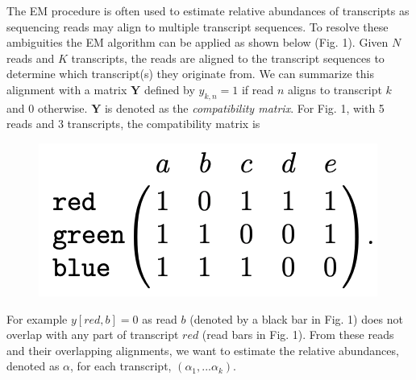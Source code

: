 \documentclass[11pt]{exam}
\begin{document}
\begin{questions}
\begin{parts}
\end{parts}
\newpage

\question[30] The EM procedure is often used to estimate relative abundances of transcripts as sequencing reads may align to multiple transcript sequences. To resolve these ambiguities the EM algorithm can be applied as shown below (Fig. 1). Given $N$ reads and $K$ transcripts, the reads are aligned to the transcript sequences to determine which transcript(s) they originate from. We can summarize this alignment with a matrix $\mathbf{Y}$ defined by $y_{k,n} = 1$ if read $n$ aligns to transcript $k$ and 0 otherwise. $\mathbf{Y}$ is denoted as the \textit{compatibility matrix}. For Fig. 1, with 5 reads and 3 transcripts, the compatibility matrix is 
\begin{figure}[!hb]
        \centering
        \includegraphics[scale=0.25]{Figures/compat.png}
    \end{figure}

For example $y[red,b] = 0$ as read $b$ (denoted by a black bar in Fig. 1) does not overlap with any part of transcript $red$ (read bars in Fig. 1). From these reads and their overlapping alignments, we want to estimate the relative abundances, denoted as $\alpha$, for each transcript, $(\alpha_1,...\alpha_k)$.


\end{questions}
\end{document}

